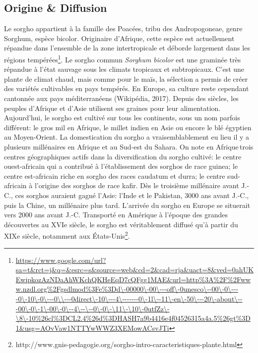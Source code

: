 \documentclass[a4paper,11pt]{article}
\begin{document}
\subsection{Origine \& Diffusion}
Le sorgho appartient à la famille des Poacées, tribu des Andropogoneae, genre Sorghum,
espèce bicolor. Originaire d'Afrique, cette espèce est actuellement répandue dans l'ensemble
de la zone intertropicale et déborde largement dans les régions tempérées\footnote{\url{https://www.google.com/url?sa=t&rct=j&q=&esrc=s&source=web&cd=2&cad=rja&uact=8&ved=0ahUKEwipkozAzNDaAhWKchQKHeEqD7cQFgg1MAE&url=http\%3A\%2F\%2Fwww.nzdl.org\%2Fgsdlmod\%3Fe\%3Dd\-00000\-00\---off\-0unesco\--00\-0\----0\-10\-0\---0\\---0direct\-10\---4\-------0\-1l\--11\-en\-50\---20\-about\---00\-0\-1\-00\-0\--4\--\--0\-0\-\11\-\10\-0utfZz\-\8\-10\%26cl\%3DCL2.4\%26d\%3DHASH7a9b4416e4f04526315a4a.5\%26gt\%3D1&usg=AOvVaw1NTTYwWWZ3XEMowACsvJTi}}. Le sorgho commun \emph{Sorghum bicolor} est
une graminée très répandue à l’état sauvage sous les climats tropicaux
et subtropicaux. C’est une plante de climat chaud, mais comme pour le
maïs, la sélection a permis de créer des variétés cultivables en pays
tempérés. En Europe, sa culture reste cependant cantonnée aux pays
méditerranéens (Wikipédia, 2017). Depuis des siècles, les peuples
d’Afrique et d’Asie utilisent ses graines pour leur alimentation. Aujourd’hui, le
sorgho est cultivé sur tous les continents, sous un nom parfois différent: le gros
mil en Afrique, le millet indien en Asie ou encore le blé égyptien au Moyen-Orient. La
domestication du sorgho a vraisemblablement eu lieu il y a plusieurs millénaires en Afrique
et au Sud-est du Sahara.  On note en Afrique\,trois centres géographiques actifs dans la
diversification du sorgho cultivé: le centre ouest-africain qui a contribué à
l’établissement des sorghos de race guinea; le centre est-africain
riche en sorgho des races caudatum et durra; le centre sud-africain à
l’origine des sorghos de race kafir. Dès le troisième millénaire
avant J.-C., ces sorghos auraient gagné l’Asie: l’Inde et le Pakistan,
3000 ans avant J.-C., puis la Chine, un millénaire plus
tard. L’arrivée du sorgho en Europe se situerait vers 2000 ans avant
J.-C. Transporté en Amérique à l’époque des grandes découvertes au
XVIe siècle, le sorgho est véritablement diffusé qu’à partir du XIXe
siècle, notamment aux États-Unis\footnote{http://www.gnis-pedagogie.org/sorgho-intro-caracteristiques-plante.html}.
\end{document}
